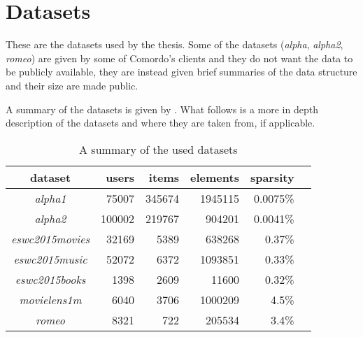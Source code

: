 \chapter{Datasets}\label{cha:datasets}

These are the datasets used by the thesis. Some of the datasets (\textit{alpha}, \textit{alpha2}, \textit{romeo}) are given by some of Comordo's clients and they do not want the data to be publicly available, they are instead given brief summaries of the data structure and their size are made public.

A summary of the datasets is given by . What follows is a more in depth description of the datasets and where they are taken from, if applicable.

\begin{table}[h]
    \centering
    \begin{tabular}{| c | r | r | r | r | l |}
        \hline
        \textbf{dataset}        & \textbf{users}    & \textbf{items}    & \textbf{elements} & \textbf{sparsity}  \\ \hline

        \textit{alpha1}         &   75007           & 345674            & 1945115           & 0.0075\%           \\ \hline
        \textit{alpha2}         &   100002          & 219767            & 904201            & 0.0041\%           \\ \hline
        \textit{eswc2015movies} &   32169           & 5389              & 638268            & 0.37\%             \\ \hline
        \textit{eswc2015music}  &   52072           & 6372              & 1093851           & 0.33\%             \\ \hline
        \textit{eswc2015books}  &   1398            & 2609              & 11600             & 0.32\%             \\ \hline
        \textit{movielens1m}    &   6040            & 3706              & 1000209           & 4.5\%              \\ \hline
        \textit{romeo}          &   8321            & 722               & 205534            & 3.4\%              \\ \hline

    \end{tabular}
    \caption{A summary of the used datasets}
    \label{tab:datasets}
\end{table}

\FloatBarrier

